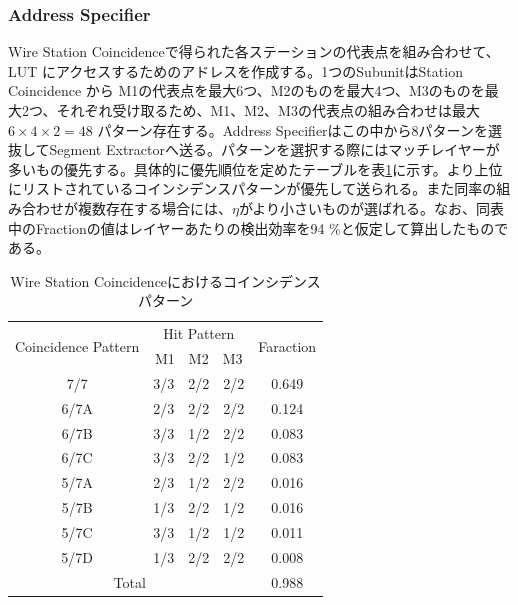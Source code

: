 \subsubsection*{Address Specifier}
Wire Station Coincidenceで得られた各ステーションの代表点を組み合わせて、LUT にアクセスするためのアドレスを作成する。1つのSubunitはStation Coincidence から M1の代表点を最大6つ、M2のものを最大4つ、M3のものを最大2つ、それぞれ受け取るため、M1、M2、M3の代表点の組み合わせは最大$6 \times 4 \times 2 = 48$ パターン存在する。Address Specifierはこの中から8パターンを選抜してSegment Extractorへ送る。パターンを選択する際にはマッチレイヤーが多いもの優先する。具体的に優先順位を定めたテーブルを表\ref{tab:StationCoin_wire}に示す。より上位にリストされているコインシデンスパターンが優先して送られる。また同率の組み合わせが複数存在する場合には、$\eta$がより小さいものが選ばれる。なお、同表中のFractionの値はレイヤーあたりの検出効率を94 \%と仮定して算出したものである。

\begin{table}[h]
    \centering
    \caption{Wire Station Coincidenceにおけるコインシデンスパターン}
    \label{tab:StationCoin_wire}
    \begin{tabular}{|cc|c|}
    \hline
    \multicolumn{1}{|c|}{\multirow{2}{*}{Coincidence Pattern}} & Hit Pattern & \multirow{2}{*}{Faraction} \\ \cline{2-2}
    \multicolumn{1}{|c|}{}                                     & M1　M2　M3    &                            \\ \hline\hline
    \multicolumn{1}{|c|}{7/7}                                  & 3/3　2/2　2/2 & 0.649                      \\ \hline
    \multicolumn{1}{|c|}{6/7A}                                 & 2/3　2/2　2/2 & 0.124                      \\ \hline
    \multicolumn{1}{|c|}{6/7B}                                 & 3/3　1/2　2/2 & 0.083                      \\ \hline
    \multicolumn{1}{|c|}{6/7C}                        & 3/3　2/2　1/2 & 0.083                      \\ \hline
    \multicolumn{1}{|c|}{5/7A}                                 & 2/3　1/2　2/2 & 0.016                      \\ \hline
    \multicolumn{1}{|c|}{5/7B}                                 & 1/3　2/2　1/2 & 0.016                      \\ \hline
    \multicolumn{1}{|c|}{5/7C}                                 & 3/3　1/2　1/2 & 0.011                      \\ \hline
    \multicolumn{1}{|c|}{5/7D}                                 & 1/3　2/2　2/2 & 0.008                      \\ \hline\hline
    \multicolumn{2}{|c|}{Total}                                              & 0.988                      \\ \hline
    \end{tabular}
\end{table}

